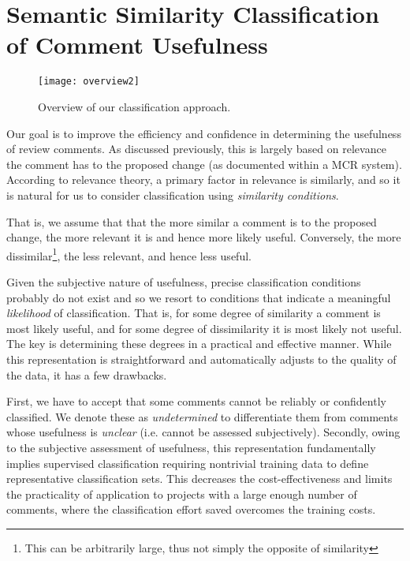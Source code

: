 
\section{Semantic Similarity Classification of Comment Usefulness}
\begin{figure}[!t]
\centering
\texttt{[image: overview2]}
\caption{Overview of our classification approach.}
\label{fig:overview}
\end{figure}

Our goal is to improve the efficiency and confidence in determining the usefulness of review comments.
As discussed previously, this is largely based on relevance the comment has to the proposed change (as documented within a MCR system).
According to relevance theory, a primary factor in relevance is similarly, and so it is natural for us to consider classification using \emph{similarity conditions}. 

That is, we assume that that the more similar a comment is to the proposed change, the more relevant it is and hence more likely useful.
Conversely, the more dissimilar\footnote{This can be arbitrarily large, thus not simply the opposite of similarity}, the less relevant, and hence less useful.

Given the subjective nature of usefulness, precise classification conditions probably do not exist and so we resort to conditions that indicate a meaningful \emph{likelihood} of classification.
That is, for some degree of similarity a comment is most likely useful, and for some degree of dissimilarity it is most likely not useful.
The key is determining these degrees in a practical and effective manner.
While this representation is straightforward and automatically adjusts to the quality of the data, it has a few drawbacks.

First, we have to accept that some comments cannot be reliably or confidently classified.
We denote these as \emph{undetermined} to differentiate them from comments whose usefulness is \emph{unclear} (i.e. cannot be assessed subjectively).
Secondly, owing to the subjective assessment of usefulness, this representation fundamentally implies supervised classification requiring nontrivial training data to define representative classification sets.
This decreases the cost-effectiveness and limits the practicality of application to projects with a large enough number of comments, where the classification effort saved overcomes the training costs.  

